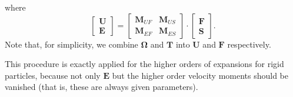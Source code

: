 \documentclass{book}
\begin{document}
where
\begin{equation}
  \left[
    \begin{array}{c}
      \bm{U}\\
      \bm{E}
    \end{array}
  \right]
  =
  \left[
    \begin{array}{cc}
      \bm{M}_{UF} & \bm{M}_{US}\\
      \bm{M}_{EF} & \bm{M}_{ES}
    \end{array}
  \right]
  \cdot
  \left[
    \begin{array}{c}
      \bm{F}\\
      \bm{S}
    \end{array}
  \right]
  .
\end{equation}
Note that, for simplicity, we combine $\bm{\Omega}$ and $\bm{T}$ into
$\bm{U}$ and $\bm{F}$ respectively.


This procedure is exactly applied for the higher orders
of expansions for rigid particles, because not only $\bm{E}$
but the higher order velocity moments should be vanished
(that is, these are always given parameters).
\end{document}
